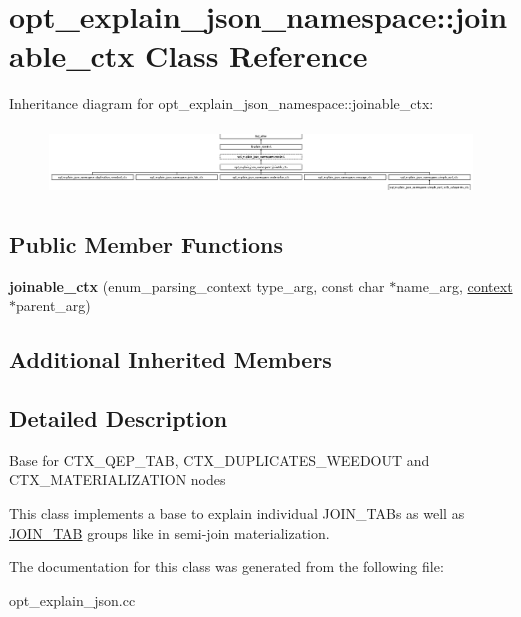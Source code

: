 \hypertarget{classopt__explain__json__namespace_1_1joinable__ctx}{}\section{opt\+\_\+explain\+\_\+json\+\_\+namespace\+:\+:joinable\+\_\+ctx Class Reference}
\label{classopt__explain__json__namespace_1_1joinable__ctx}
Inheritance diagram for opt\+\_\+explain\+\_\+json\+\_\+namespace\+:\+:joinable\+\_\+ctx\+:\begin{figure}[H]
\begin{center}
\leavevmode
\includegraphics[height=1.796791cm]{classopt__explain__json__namespace_1_1joinable__ctx}
\end{center}
\end{figure}
\subsection*{Public Member Functions}
\begin{DoxyCompactItemize}
\item 
\mbox{\label{classopt__explain__json__namespace_1_1joinable__ctx_aa0ba0cd39a05dfd0b65486711bb466da}} 
{\bfseries joinable\+\_\+ctx} (enum\+\_\+parsing\+\_\+context type\+\_\+arg, const char $\ast$name\+\_\+arg, \mbox{\hyperlink{classopt__explain__json__namespace_1_1context}{context}} $\ast$parent\+\_\+arg)
\end{DoxyCompactItemize}
\subsection*{Additional Inherited Members}


\subsection{Detailed Description}
Base for C\+T\+X\+\_\+\+Q\+E\+P\+\_\+\+T\+AB, C\+T\+X\+\_\+\+D\+U\+P\+L\+I\+C\+A\+T\+E\+S\+\_\+\+W\+E\+E\+D\+O\+UT and C\+T\+X\+\_\+\+M\+A\+T\+E\+R\+I\+A\+L\+I\+Z\+A\+T\+I\+ON nodes

This class implements a base to explain individual J\+O\+I\+N\+\_\+\+T\+A\+Bs as well as \mbox{\hyperlink{classJOIN__TAB}{J\+O\+I\+N\+\_\+\+T\+AB}} groups like in semi-\/join materialization. 

The documentation for this class was generated from the following file\+:\begin{DoxyCompactItemize}
\item 
opt\+\_\+explain\+\_\+json.\+cc\end{DoxyCompactItemize}
